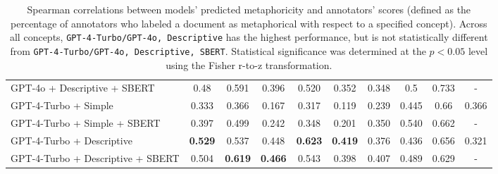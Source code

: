 \begin{table*}[htbp!]
{\begin{tabular}{@{}lccccccccc@{}}
GPT-4o + Descriptive + SBERT      & 0.48           & 0.591          & 0.396          & 0.520          & 0.352          & 0.348          & 0.5            & 0.733          & -               \\
GPT-4-Turbo + Simple              & 0.333          & 0.366          & 0.167          & 0.317          & 0.119          & 0.239          & 0.445          & 0.66           & 0.366           \\
GPT-4-Turbo + Simple + SBERT      & 0.397          & 0.499          & 0.242          & 0.348          & 0.201          & 0.350          & 0.540          & 0.662          & -               \\
GPT-4-Turbo + Descriptive         & \textbf{0.529} & 0.537          & 0.448          & \textbf{0.623} & \textbf{0.419} & 0.376          & 0.436          & 0.656          & 0.321           \\
GPT-4-Turbo + Descriptive + SBERT & 0.504          & \textbf{0.619} & \textbf{0.466} & 0.543          & 0.398          & 0.407          & 0.489          & 0.629          & -               \\ \bottomrule
\end{tabular}%
}
\caption{Spearman correlations between models' predicted metaphoricity and annotators' scores (defined as the percentage of annotators who labeled a document as metaphorical with respect to a specified concept). Across all concepts, \texttt{GPT-4-Turbo/GPT-4o, Descriptive} has the highest performance, but is not statistically different from \texttt{GPT-4-Turbo/GPT-4o, Descriptive, SBERT}. Statistical significance was determined at the $p < 0.05$ level using the Fisher r-to-z transformation.}
\label{tab:spearman}
\end{table*}